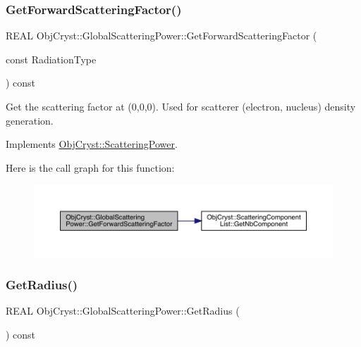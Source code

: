 \subsubsection{\texorpdfstring{GetForwardScatteringFactor()}{GetForwardScatteringFactor()}}
{\footnotesize\ttfamily R\+E\+AL Obj\+Cryst\+::\+Global\+Scattering\+Power\+::\+Get\+Forward\+Scattering\+Factor (\begin{DoxyParamCaption}\item[{const}]{Radiation\+Type }\end{DoxyParamCaption}) const\hspace{0.3cm}{\ttfamily [virtual]}}

Get the scattering factor at (0,0,0). Used for scatterer (electron, nucleus) density generation. 

Implements \mbox{\hyperlink{class_obj_cryst_1_1_scattering_power_a854b51b9b08e96af0fe7986fe372c50c}{Obj\+Cryst\+::\+Scattering\+Power}}.

Here is the call graph for this function\+:
\nopagebreak
\begin{figure}[H]
\begin{center}
\leavevmode
\includegraphics[width=350pt]{class_obj_cryst_1_1_global_scattering_power_a76cf0e6d0bb30b0f7036cb6b65b45410_cgraph}
\end{center}
\end{figure}
\mbox{\label{class_obj_cryst_1_1_global_scattering_power_af70a0e97e094efd9b45e75122b43d2ea}} 
\subsubsection{\texorpdfstring{GetRadius()}{GetRadius()}}
{\footnotesize\ttfamily R\+E\+AL Obj\+Cryst\+::\+Global\+Scattering\+Power\+::\+Get\+Radius (\begin{DoxyParamCaption}{ }\end{DoxyParamCaption}) const\hspace{0.3cm}{\ttfamily [virtual]}}

